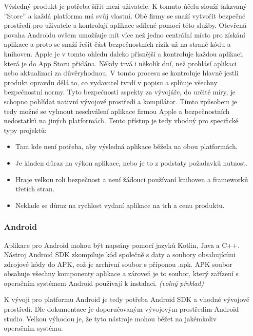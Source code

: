 \documentclass[
  glossaries,
]{kidiplom}
\begin{document}
Výsledný produkt je potřeba šířit mezi uživatele. K tomuto účelu slouží takzvaný ''Store'' a každá platforma má svůj vlastní. Obě firmy se snaží vytvořit bezpečné prostředí pro uživatele a kontrolují aplikace sdílené pomocí této služby. Otevřená povaha Androidu ovšem umožňuje mít více než jedno centrální místo pro získání aplikace a proto se snaží řešit část bezpečnostních rizik už na straně kódu a knihoven. Apple je v tomto ohledu daleko přísnější a kontroluje každou aplikaci, která je do App Storu přidána. Někdy trvá i několik dní, než prohlásí aplikaci nebo aktualizaci za důvěryhodnou. V tomto procesu se kontroluje hlavně jestli produkt opravdu dělá to, co vydavatel tvrdí v popisu a splňuje všechny bezpečnostní normy. Tyto bezpečností aspekty za vývojáře, do určité míry, je schopno pohlídat nativní vývojové prostředí a kompilátor. Tímto způsobem je tedy možné se vyhnout neschválení aplikace firmou Apple a bezpečnostních nedostatků na jiných platformách. Tento přístup je tedy vhodný pro specifické typy projektů:
\begin{itemize}
	\item Tam kde není potřeba, aby výsledná aplikace běžela na obou platformách.
  	\item Je kladen důraz na výkon aplikace, nebo je to z podstaty požadavků nutnost.
  	\item Hraje velkou roli bezpečnost a není žádoucí používaní knihoven a frameworků třetích stran. 
  	\item Neklade se důraz na rychlost vydaní aplikace na trh a cenu produktu.
 \end{itemize}

\subsubsection{Android}
Aplikace pro Android mohou být napsány pomocí jazyků Kotlin, Java a C++. Nástroj Android SDK zkompiluje kód společně s daty a soubory obsahujícími zdrojové kódy do APK, což je archivní soubor s příponou .apk. APK soubor obsahuje všechny komponenty aplikace a zároveň je to soubor, který zařízení s operačním systémem Android používají k instalaci.
\cite{1}
\textit{(volný překlad)}

K vývoji pro platformu Android je tedy potřeba Android SDK a vhodné vývojové prostředí. Dle dokumentace je doporučovaným vývojovým prostředím Android studio. Velkou výhodou je, že tyto nástroje mohou běžet na jakémkoliv operačním systému.
\end{document}
